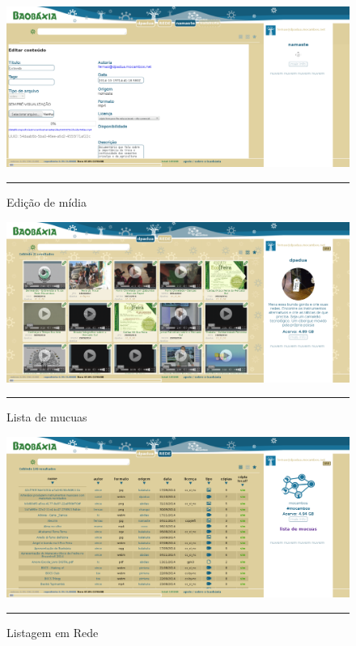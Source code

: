 \begin{figure}[htbp]
  \centering
  \includegraphics[width=\textwidth]{./Fig/InterfaceBaobaxia-media-edit.pdf}
  \rule{35em}{0.5pt}
  \caption[Edição de mídia]{Edição de mídia}
  \label{fig:InterfaceBaobaxia-media-edit}
\end{figure}

\begin{figure}[htbp]
  \centering
  \includegraphics[width=\textwidth]{./Fig/InterfaceBaobaxia-mucua-listagem.pdf}
  \rule{35em}{0.5pt}
  \caption[Lista de mucuas]{Lista de mucuas}
  \label{fig:InterfaceBaobaxia-mucua-listagem}
\end{figure}

\begin{figure}[htbp]
  \centering
  \includegraphics[width=\textwidth]{./Fig/InterfaceBaobaxia-rede-listagem.pdf}
  \rule{35em}{0.5pt}
  \caption[Listagem em Rede]{Listagem em Rede}
  \label{fig:InterfaceBaobaxia-rede-listagem}
\end{figure}

